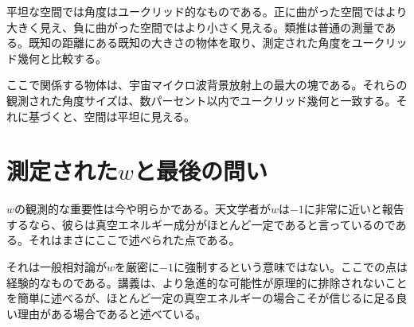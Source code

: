平坦な空間では角度はユークリッド的なものである。正に曲がった空間ではより大きく見え、負に曲がった空間ではより小さく見える。類推は普通の測量である。既知の距離にある既知の大きさの物体を取り、測定された角度をユークリッド幾何と比較する。

\begin{classroomqa}
\end{classroomqa}

ここで関係する物体は、宇宙マイクロ波背景放射上の最大の塊である。それらの観測された角度サイズは、数パーセント以内でユークリッド幾何と一致する。それに基づくと、空間は平坦に見える。

\section{測定された\(w\)と最後の問い}

\(w\)の観測的な重要性は今や明らかである。天文学者が\(w\)は\(-1\)に非常に近いと報告するなら、彼らは真空エネルギー成分がほとんど一定であると言っているのである。それはまさにここで述べられた点である。

それは一般相対論が\(w\)を厳密に\(-1\)に強制するという意味ではない。ここでの点は経験的なものである。講義は、より急進的な可能性が原理的に排除されないことを簡単に述べるが、ほとんど一定の真空エネルギーの場合こそが信じるに足る良い理由がある場合であると述べている。

\begin{classroomqa}
\end{classroomqa}
